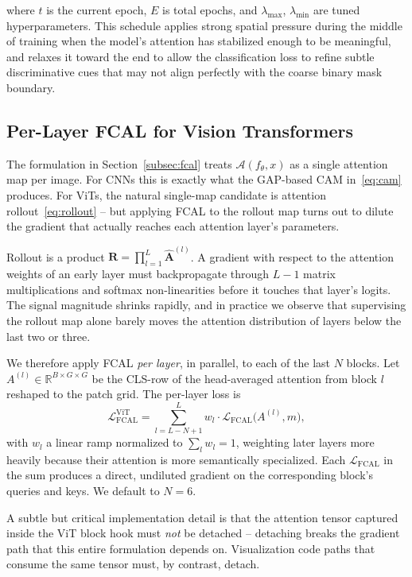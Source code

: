 \documentclass[journal]{IEEEtran}
\begin{document}
where $t$ is the current epoch, $E$ is total epochs, and
$\lambda_{\max}$, $\lambda_{\min}$ are tuned hyperparameters.
This schedule applies strong spatial pressure during the middle
of training when the model's attention has stabilized enough
to be meaningful, and relaxes it toward the end to allow the
classification loss to refine subtle discriminative cues that
may not align perfectly with the coarse binary mask boundary.


\subsection{Per-Layer FCAL for Vision Transformers}
\label{subsec:perlayer}

The formulation in Section~\ref{subsec:fcal} treats $\mathcal{A}(f_\theta, x)$
as a single attention map per image. For CNNs this is exactly what the
GAP-based CAM in~\eqref{eq:cam} produces. For ViTs, the natural single-map
candidate is attention rollout~\eqref{eq:rollout} -- but applying FCAL to
the rollout map turns out to dilute the gradient that actually reaches each
attention layer's parameters.

Rollout is a product $\mathbf{R} = \prod_{l=1}^{L} \hat{\mathbf{A}}^{(l)}$.
A gradient with respect to the attention weights of an early layer must
backpropagate through $L{-}1$ matrix multiplications and softmax non-linearities
before it touches that layer's logits. The signal magnitude shrinks rapidly,
and in practice we observe that supervising the rollout map alone barely
moves the attention distribution of layers below the last two or three.

We therefore apply FCAL \emph{per layer}, in parallel, to each of the last
$N$ blocks. Let $A^{(l)} \in \mathbb{R}^{B \times G \times G}$ be the
CLS-row of the head-averaged attention from block $l$ reshaped to the patch
grid. The per-layer loss is
\begin{equation}
  \mathcal{L}_{\mathrm{FCAL}}^{\mathrm{ViT}}
  = \sum_{l = L - N + 1}^{L} w_l \cdot
    \mathcal{L}_{\mathrm{FCAL}}\!\bigl(A^{(l)}, m\bigr),
  \label{eq:fcal_perlayer}
\end{equation}
with $w_l$ a linear ramp normalized to $\sum_l w_l = 1$, weighting later
layers more heavily because their attention is more semantically
specialized. Each $\mathcal{L}_{\mathrm{FCAL}}$ in the sum produces a
direct, undiluted gradient on the corresponding block's queries and keys.
We default to $N = 6$.

A subtle but critical implementation detail is that the attention tensor
captured inside the ViT block hook must \emph{not} be detached -- detaching
breaks the gradient path that this entire formulation depends on. Visualization
code paths that consume the same tensor must, by contrast, detach.
\end{document}
